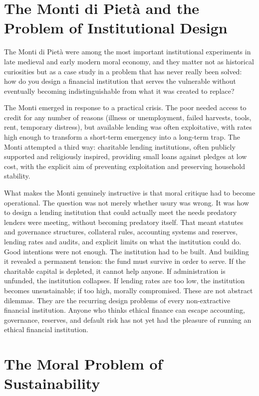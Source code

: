 \documentclass[11pt,a4paper,oneside]{book}
\begin{document}
\section*{The Monti di Pietà and the Problem of Institutional Design}

The Monti di Pietà were among the most important institutional experiments in late medieval and early modern moral economy, and they matter not as historical curiosities but as a case study in a problem that has never really been solved: how do you design a financial institution that serves the vulnerable without eventually becoming indistinguishable from what it was created to replace?

The Monti emerged in response to a practical crisis. The poor needed access to credit for any number of reasons (illness or unemployment, failed harvests, tools, rent, temporary distress), but available lending was often exploitative, with rates high enough to transform a short-term emergency into a long-term trap. The Monti attempted a third way: charitable lending institutions, often publicly supported and religiously inspired, providing small loans against pledges at low cost, with the explicit aim of preventing exploitation and preserving household stability.

What makes the Monti genuinely instructive is that moral critique had to become operational. The question was not merely whether usury was wrong. It was how to design a lending institution that could actually meet the needs predatory lenders were meeting, without becoming predatory itself. That meant statutes and governance structures, collateral rules, accounting systems and reserves, lending rates and audits, and explicit limits on what the institution could do. Good intentions were not enough. The institution had to be built. And building it revealed a permanent tension: the fund must survive in order to serve. If the charitable capital is depleted, it cannot help anyone. If administration is unfunded, the institution collapses. If lending rates are too low, the institution becomes unsustainable; if too high, morally compromised. These are not abstract dilemmas. They are the recurring design problems of every non-extractive financial institution. Anyone who thinks ethical finance can escape accounting, governance, reserves, and default risk has not yet had the pleasure of running an ethical financial institution.

\section*{The Moral Problem of Sustainability}
\end{document}
